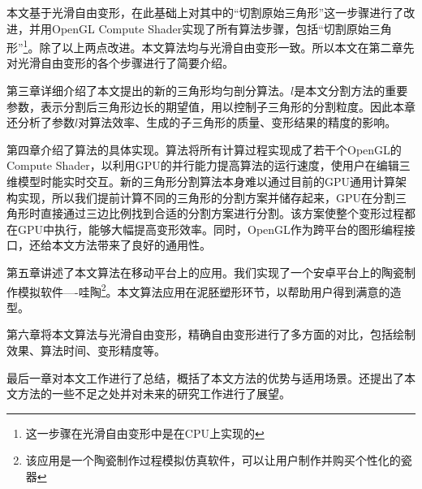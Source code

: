 本文基于光滑自由变形，在此基础上对其中的“切割原始三角形”这一步骤进行了改进，并用OpenGL Compute Shader实现了所有算法步骤，包括“切割原始三角形”\footnote{这一步骤在光滑自由变形中是在CPU上实现的}。除了以上两点改进。本文算法均与光滑自由变形一致。所以本文在第二章先对光滑自由变形\cite{Cui15}的各个步骤进行了简要介绍。

第三章详细介绍了本文提出的新的三角形均匀剖分算法。$l$是本文分割方法的重要参数，表示分割后三角形边长的期望值，用以控制子三角形的分割粒度。因此本章还分析了参数$l$对算法效率、生成的子三角形的质量、变形结果的精度的影响。

第四章介绍了算法的具体实现。算法将所有计算过程实现成了若干个OpenGL的Compute Shader，以利用GPU的并行能力提高算法的运行速度，使用户在编辑三维模型时能实时交互。新的三角形分割算法本身难以通过目前的GPU通用计算架构实现，所以我们提前计算不同的三角形的分割方案并储存起来，GPU在分割三角形时直接通过三边比例找到合适的分割方案进行分割。该方案使整个变形过程都在GPU中执行，能够大幅提高变形效率。同时，OpenGL作为跨平台的图形编程接口，还给本文方法带来了良好的通用性。

第五章讲述了本文算法在移动平台上的应用。我们实现了一个安卓平台上的陶瓷制作模拟软件----哇陶\footnote{该应用是一个陶瓷制作过程模拟仿真软件，可以让用户制作并购买个性化的瓷器}。本文算法应用在泥胚塑形环节，以帮助用户得到满意的造型。

第六章将本文算法与光滑自由变形\cite{Cui15}，精确自由变形\cite{Feng00}进行了多方面的对比，包括绘制效果、算法时间、变形精度等。

最后一章对本文工作进行了总结，概括了本文方法的优势与适用场景。还提出了本文方法的一些不足之处并对未来的研究工作进行了展望。





